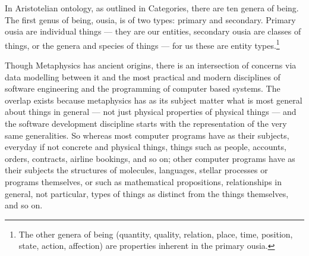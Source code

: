 In Aristotelian ontology, as outlined in Categories, there are ten genera of being. The first genus of being, ousia, is of two types: primary and secondary. Primary ousia are individual things — they are our entities, secondary ousia are classes of things, or the genera and species of things
 — for us these are entity types.\footnote{The other genera of being
  (quantity, quality, relation, place, time, position, state, action, affection)
  are properties inherent in the primary ousia.}

Though Metaphysics has ancient origins, there is an intersection of concerns via data modelling between it and the most practical and modern disciplines of software engineering and the programming of computer based systems. The overlap exists because metaphysics has as its subject matter what is most general about things in general — not just physical properties of physical things — and the software development discipline starts with the representation of the very same generalities. So whereas most computer programs have as their subjects, everyday if not concrete and physical things, things such as people, accounts, orders, contracts, airline bookings, and so on; other computer programs have as their subjects the structures of molecules, languages, stellar processes or programs themselves, or such as mathematical propositions, relationships in general, not particular, types of things as distinct from the things themselves, and so on. 

